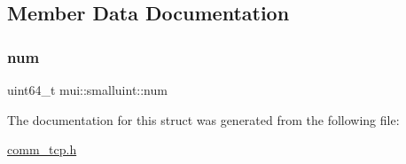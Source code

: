 \subsection{Member Data Documentation}
\mbox{\label{structmui_1_1smalluint_a886826793cb7201c57751dc505404875}} 
\subsubsection{\texorpdfstring{num}{num}}
{\footnotesize\ttfamily uint64\+\_\+t mui\+::smalluint\+::num}



The documentation for this struct was generated from the following file\+:\begin{DoxyCompactItemize}
\item 
\hyperlink{comm__tcp_8h}{comm\+\_\+tcp.\+h}\end{DoxyCompactItemize}
